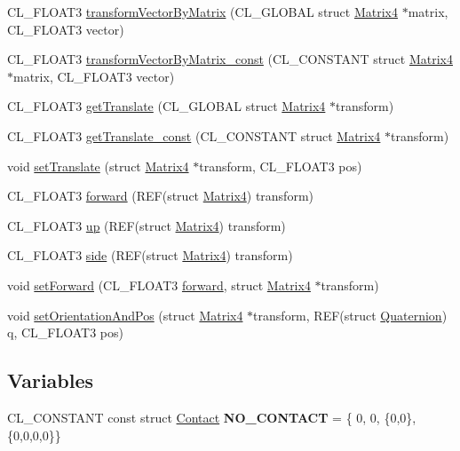 \begin{DoxyCompactItemize}
C\+L\+\_\+\+F\+L\+O\+A\+T3 \hyperlink{group__g12_ga210c2abe104b8b2bf78aa4c5ca33de5f}{transform\+Vector\+By\+Matrix} (C\+L\+\_\+\+G\+L\+O\+B\+AL struct \hyperlink{struct_matrix4}{Matrix4} $\ast$matrix, C\+L\+\_\+\+F\+L\+O\+A\+T3 vector)
\item 
C\+L\+\_\+\+F\+L\+O\+A\+T3 \hyperlink{group__g12_ga8c5db929860b2dd7c915ba6036ea9ec7}{transform\+Vector\+By\+Matrix\+\_\+const} (C\+L\+\_\+\+C\+O\+N\+S\+T\+A\+NT struct \hyperlink{struct_matrix4}{Matrix4} $\ast$matrix, C\+L\+\_\+\+F\+L\+O\+A\+T3 vector)
\item 
C\+L\+\_\+\+F\+L\+O\+A\+T3 \hyperlink{group__g12_gaf7c337bbc999d8405021f3aaf6b98906}{get\+Translate} (C\+L\+\_\+\+G\+L\+O\+B\+AL struct \hyperlink{struct_matrix4}{Matrix4} $\ast$transform)
\item 
C\+L\+\_\+\+F\+L\+O\+A\+T3 \hyperlink{group__g12_ga5d10bde3877494a1a9bc98ecd48f8748}{get\+Translate\+\_\+const} (C\+L\+\_\+\+C\+O\+N\+S\+T\+A\+NT struct \hyperlink{struct_matrix4}{Matrix4} $\ast$transform)
\item 
void \hyperlink{group__g12_ga67283bc5432875c8ad3382d2a6fe3eae}{set\+Translate} (struct \hyperlink{struct_matrix4}{Matrix4} $\ast$transform, C\+L\+\_\+\+F\+L\+O\+A\+T3 pos)
\item 
C\+L\+\_\+\+F\+L\+O\+A\+T3 \hyperlink{group__g12_ga6c3506781257c6c000660710a6ac5c3c}{forward} (R\+EF(struct \hyperlink{struct_matrix4}{Matrix4}) transform)
\item 
C\+L\+\_\+\+F\+L\+O\+A\+T3 \hyperlink{group__g12_ga6ecb966628ac6a5e4092bbd4b2fd3967}{up} (R\+EF(struct \hyperlink{struct_matrix4}{Matrix4}) transform)
\item 
C\+L\+\_\+\+F\+L\+O\+A\+T3 \hyperlink{group__g12_ga6eb604fd7b5a01a34c5edc05ce242b0a}{side} (R\+EF(struct \hyperlink{struct_matrix4}{Matrix4}) transform)
\item 
void \hyperlink{group__g12_ga6d2b0a26a653d5d180b73f7224b4b3e8}{set\+Forward} (C\+L\+\_\+\+F\+L\+O\+A\+T3 \hyperlink{group__g12_ga6c3506781257c6c000660710a6ac5c3c}{forward}, struct \hyperlink{struct_matrix4}{Matrix4} $\ast$transform)
\item 
void \hyperlink{group__g12_ga8482fa67d493ed2da669a730f2215831}{set\+Orientation\+And\+Pos} (struct \hyperlink{struct_matrix4}{Matrix4} $\ast$transform, R\+EF(struct \hyperlink{struct_quaternion}{Quaternion}) q, C\+L\+\_\+\+F\+L\+O\+A\+T3 pos)
\end{DoxyCompactItemize}
\subsection*{Variables}
\begin{DoxyCompactItemize}
\item 
C\+L\+\_\+\+C\+O\+N\+S\+T\+A\+NT const struct \hyperlink{struct_contact}{Contact} {\bfseries N\+O\+\_\+\+C\+O\+N\+T\+A\+CT} = \{ 0, 0, \{0,0\},\{0,0,0,0\}\}\hypertarget{group__g12_ga50cd5e0d8225ce74c7b54e349f19c437}{}\label{group__g12_ga50cd5e0d8225ce74c7b54e349f19c437}

\end{DoxyCompactItemize}



